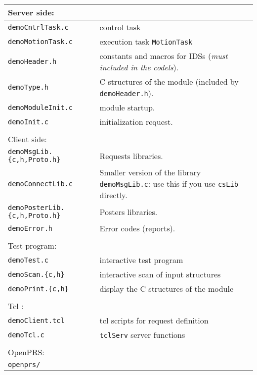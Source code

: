 \begin{center}\small
 \begin{tabularx}{\linewidth}{|l|X|}
 \hline
 \multicolumn{2}{|l|}{Server side: } \\
 \hline
 {\tt demoCntrlTask.c}& control task \\
 {\tt demoMotionTask.c}& execution task {\tt MotionTask}  \\
 {\tt demoHeader.h}&  constants and macros for IDSs ({\em must included
in the codels}). \\
 {\tt demoType.h}&  C structures of the module
 (included by {\tt demoHeader.h}). \\ 
 {\tt demoModuleInit.c}& module startup. \\
 {\tt demoInit.c}& initialization request.  \\
 \hline
 \multicolumn{2}{l}{} \\

 \hline
 \multicolumn{2}{|l|}{Client side: } \\
 \hline
 {\tt demoMsgLib.\{c,h,Proto.h\}}  &  Requests libraries. \\
 {\tt demoConnectLib.c}  &  Smaller version of the library {\tt
demoMsgLib.c}: use this if you use {\tt csLib} directly. \\
 {\tt demoPosterLib.\{c,h,Proto.h\}}  &  Posters libraries.\\
 {\tt demoError.h}  &  Error codes (reports).\\
 \hline
 \multicolumn{2}{l}{} \\

 \hline
 \multicolumn{2}{|l|}{Test program:} \\
 \hline
 {\tt demoTest.c}  &  interactive test program\\
 {\tt demoScan.\{c,h\}}  &  interactive  scan of input structures\\
 {\tt demoPrint.\{c,h\}}  &  display the C structures of the module\\
 \hline
 \multicolumn{2}{l}{} \\

 \hline
 \multicolumn{2}{|l|}{Tcl :} \\
 \hline
 {\tt demoClient.tcl}  &  tcl scripts for request definition\\
 {\tt demoTcl.c}  &   {\tt tclServ} server functions\\
 \hline
 \multicolumn{2}{l}{} \\

 \hline
 \multicolumn{2}{|l|}{OpenPRS:} \\
 \hline
 {\tt openprs/}  & \\
 \hline
 \end{tabularx}
\end{center}


